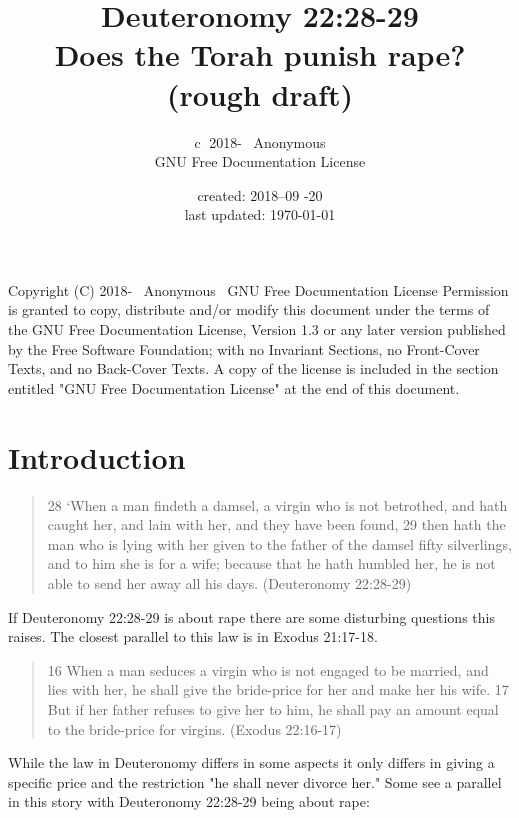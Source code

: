 \documentclass[11pt]{article}
\title{\textbf{Deuteronomy 22:28-29} \large \\ Does the Torah punish rape? (rough draft) }
\author{\textcircled{c} 2018-\the\year
 \ Anonymous \\ GNU Free Documentation License  }
\date{created: 2018--09 -20 \\ last updated: \today{}}
\begin{document}
\maketitle
\tableofcontents 

\noindent \newline Copyright (C) 2018-\the\year
 \ Anonymous \ GNU Free Documentation License \newline
Permission is granted to copy, distribute and/or modify this document\newline
under the terms of the GNU Free Documentation License, Version 1.3\newline
or any later version published by the Free Software Foundation;\newline
with no Invariant Sections, no Front-Cover Texts, and no Back-Cover Texts.\newline
A copy of the license is included in the section entitled "GNU\newline
Free Documentation License" at the end of this document.

\section{Introduction}

\begin{quote}
28 `When a man findeth a damsel, a virgin who is not betrothed, and hath caught her, and lain with her, and they have been found,
29 then hath the man who is lying with her given to the father of the damsel fifty silverlings, and to him she is for a wife; because that he hath humbled her, he is not able to send her away all his days. (Deuteronomy 22:28-29)
\end{quote}

If Deuteronomy 22:28-29 is about rape there are some disturbing questions this raises. The closest parallel to this law is in Exodus 21:17-18.

\begin{quote}
16 When a man seduces a virgin who is not engaged to be married, and lies with her, he shall give the bride-price for her and make her his wife. 17 But if her father refuses to give her to him, he shall pay an amount equal to the bride-price for virgins. (Exodus 22:16-17)
\end{quote}

While the law in Deuteronomy differs in some aspects it only differs in giving a specific price and the restriction "he shall never divorce her." Some see a parallel in this story with Deuteronomy 22:28-29 being about rape:
\end{document}

